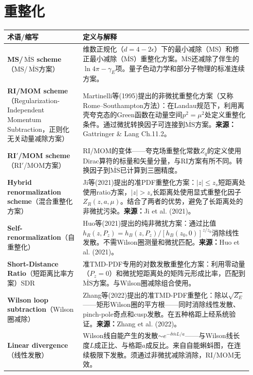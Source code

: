 \documentclass[12pt,a4paper]{ctexart}
\begin{document}
\section{重整化}

\begin{longtable}{p{3.5cm}p{9cm}}
\toprule
\textbf{术语/缩写} & \textbf{定义与解释} \\
\midrule
\endhead
\textbf{MS/$\,\overline{\text{MS}}$ scheme}（MS/$\,\overline{\text{MS}}$方案）& 维数正规化（$d=4-2\epsilon$）下的最小减除（MS）和修正最小减除（$\overline{\text{MS}}$）重整化方案。$\overline{\text{MS}}$还减除了伴生的$\ln 4\pi - \gamma_E$项。量子色动力学和部分子物理的标准连续方案。\\
\textbf{RI/MOM scheme}（Regularization-Independent Momentum Subtraction，正则化无关动量减除方案）& Martinelli等(1995)提出的非微扰重整化方案（又称Rome--Southampton方法）：在Landau规范下，利用离壳夸克态的Green函数在动量空间$p^2=\mu^2$处定义重整化条件。通过微扰转换因子可连接到$\overline{\text{MS}}$方案。\textbf{来源：}Gattringer \& Lang Ch.11.2。\\
\textbf{RI$'$/MOM scheme}（RI$'$/MOM方案）& RI/MOM的变体——夸克场重整化常数$Z_q$的定义使用Dirac算符的标量和矢量分量，与RI方案有所不同。转换因子到$\overline{\text{MS}}$已计算到三圈精度。\\
\textbf{Hybrid renormalization scheme}（混合重整化方案）& Ji等(2021)提出的准PDF重整化方案：$|z|\le z_s$短距离处使用ratio方案，$|z|>z_s$长距离处使用显式重整化因子$Z_R(z,a,\mu)$。结合了两者的优势，避免了长距离处的非微扰污染。\textbf{来源：}Ji et al. (2021)。\\
\textbf{Self-renormalization}（自重整化）& Huo等(2021)提出的纯非微扰方案：通过比值$h_R(z,P_z) = h_B(z,P_z)/[h_B(z_0,0)]^{z/z_0}$消除线性发散。不需Wilson圈测量和微扰匹配。\textbf{来源：}Huo et al. (2021)。\\
\textbf{Short-Distance Ratio}（短距离比率方案）SDR& 准TMD-PDF专用的对数发散重整化方案：利用零动量（$P_z=0$）和微扰短距离处的矩阵元形成比率，匹配到$\overline{\text{MS}}$方案。与Wilson圈减除组合使用。\\
\textbf{Wilson loop subtraction}（Wilson圈减除）& Zhang等(2022)提出的准TMD-PDF重整化：除以$\sqrt{Z_E}$——矩形Wilson圈的平方根——同时消除线性发散、pinch-pole奇点和cusp发散。在五种格距上经系统验证。\textbf{来源：}Zhang et al. (2022)。\\
\textbf{Linear divergence}（线性发散）& Wilson线自能产生的发散$\sim e^{-\delta\bar m L/a}$——与Wilson线长度$L$成正比、与格距$a$成反比。来自自能蝌蚪图，在连续极限下发散。须通过非微扰减除消除，RI/MOM无效。\\

\end{longtable}
\end{document}
